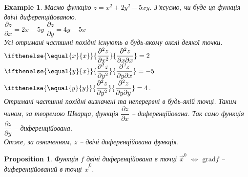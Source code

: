 \documentclass[a4paper, 10pt]{article}
\def\departial#1#2{\dfrac{\partial {#1}}{\partial {#2}}}
\def\seconddepartial#1#2#3{\ifthenelse{\equal{#2}{#3}}{\dfrac{\partial^2 {#1}}{\partial {#2}^2}}{\dfrac{\partial^2 {#1}}{\partial {#2} \partial {#3}}}}
\theoremstyle{theoremdd}
\theoremstyle{theoremdd}
\theoremstyle{theoremdd}
\theoremstyle{theoremdd}
\theoremstyle{theoremdd}
\newtheorem{example}[theorem]{Example}
\theoremstyle{theoremdd}
\newtheorem{proposition}[theorem]{Proposition}
\theoremstyle{theoremdd}
\theoremstyle{theoremdd}
\theoremstyle{theoremdd}
\newcommand\Norm[1]{\|#1\|}
\begin{document}
\begin{example}
Маємо функцію $z = x^2+2y^2-5xy$. З'ясуємо, чи буде ця функція двічі диференційованою.\\
$\departial{z}{x} = 2x-5y$ \hspace{1cm} $\departial{z}{y} = 4y-5x$\\
Усі отримані частинні похідні існують в будь-якому околі деякої точки.\\
$\seconddepartial{z}{x}{x} = 2$ \hspace{1cm} $\seconddepartial{z}{y}{x} = -5$ \hspace{1cm} $\seconddepartial{z}{y}{y} = 4$.\\
Отримані частинні похідні визначені та неперервні в будь-якій точці. Таким чином, за теоремою Шварца, функція $\departial{z}{x}$ -- диференційована. Так само функція $\departial{z}{y}$ -- диференційована.\\
Отже, за означенням, $z$ -- двічі диференційована функція.
\end{example}

\begin{proposition}
Функція $f$ двічі диференційована в точці $\vec{x}^0$ $\iff$ $\textrm{grad} f$ -- диференційований в точці $\vec{x}^0$.

\end{proposition}
\end{document}
